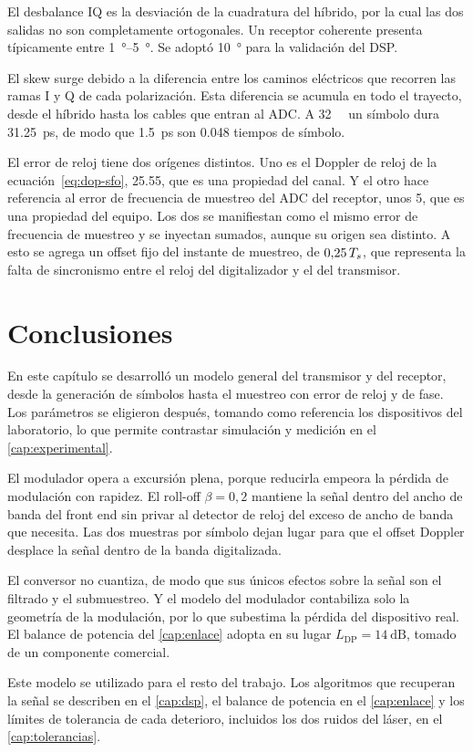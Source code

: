 El desbalance IQ es la desviaci\'on de la cuadratura del h\'ibrido, por la cual
las dos salidas no son completamente ortogonales. Un receptor
coherente presenta t\'ipicamente entre \SIrange{1}{5}{\degree}. Se adopt\'o \SI{10}{\degree} para la validaci\'on del DSP.

El skew surge debido a la diferencia entre los caminos el\'ectricos que recorren las ramas I y Q de cada polarizaci\'on. Esta diferencia se acumula en todo el trayecto, desde el híbrido hasta los cables que entran al ADC. A \SI{32}{\giga\baud} un símbolo dura \SI{31.25}{\pico\second}, de modo que \SI{1.5}{\pico\second} son \num{0.048} tiempos de símbolo.

El error de reloj tiene dos or\'igenes distintos. Uno es el Doppler de reloj de la
ecuaci\'on~\eqref{eq:dop-sfo}, \SI{25.55}{\ppm}, que es una propiedad del
canal. Y el otro hace referencia al error de frecuencia de muestreo del ADC del receptor, unos
\SI{5}{\ppm}, que es una propiedad del equipo. Los dos se manifiestan como el
mismo error de frecuencia de muestreo y se inyectan sumados, aunque su origen
sea distinto. A esto se agrega un offset fijo del instante de muestreo, de
$0{,}25\,T_{s}$, que representa la falta de sincronismo entre el reloj del
digitalizador y el del transmisor.

\section{Conclusiones}
\label{sec:trx-conclusiones}


En este cap\'itulo se desarroll\'o un modelo general del transmisor y del
receptor, desde la generaci\'on de s\'imbolos hasta el muestreo con error de
reloj y de fase. Los par\'ametros se eligieron despu\'es, tomando como
referencia los dispositivos del laboratorio, lo que permite contrastar
simulaci\'on y medici\'on en el \cref{cap:experimental}.


El modulador opera a excursi\'on plena,
porque reducirla empeora la p\'erdida de modulaci\'on con rapidez. El roll-off
$\beta = 0{,}2$ mantiene la se\~nal dentro del ancho de banda del front end sin privar al detector
de reloj del exceso de ancho de banda que necesita. Las dos muestras por
s\'imbolo dejan lugar para que el offset Doppler desplace la se\~nal dentro de
la banda digitalizada.

El conversor no cuantiza, de modo
que sus \'unicos efectos sobre la se\~nal son el filtrado y el submuestreo. Y el
modelo del modulador contabiliza solo la geometr\'ia de la modulaci\'on, por
lo que subestima la p\'erdida del dispositivo real. El balance de potencia del
\cref{cap:enlace} adopta en su lugar $L_{\mathrm{DP}} = \SI{14}{\dB}$, tomado
de un componente comercial.

Este modelo se utilizado para el resto del trabajo. Los algoritmos que recuperan la
se\~nal se describen en el \cref{cap:dsp}, el balance de potencia en el
\cref{cap:enlace} y los l\'imites de tolerancia de cada deterioro, incluidos
los dos ruidos del l\'aser, en el \cref{cap:tolerancias}.